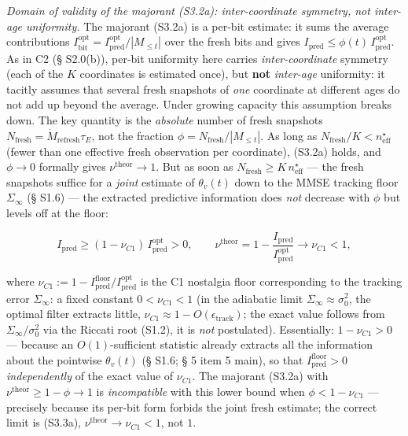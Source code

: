 \documentclass[12pt]{iopart}
\begin{document}
\emph{Domain of validity of the majorant (S3.2a): inter-coordinate symmetry, not inter-age uniformity.} The majorant (S3.2a) is a per-bit estimate: it sums the average contributions \(I^{\text{opt}}_{\text{bit}} = I_{\text{pred}}^{\text{opt}}/|M_{\le t}|\) over the fresh bits and gives \(I_{\text{pred}} \le \phi(t)\,I_{\text{pred}}^{\text{opt}}\). As in C2 (§ S2.0(b)), per-bit uniformity here carries \emph{inter-coordinate} symmetry (each of the \(K\) coordinates is estimated once), but \textbf{not} \emph{inter-age} uniformity: it tacitly assumes that several fresh snapshots of \emph{one} coordinate at different ages do not add up beyond the average. Under growing capacity this assumption breaks down. The key quantity is the \emph{absolute} number of fresh snapshots \(N_{\text{fresh}} = \dot M_{\text{refresh}}\tau_E\), not the fraction \(\phi = N_{\text{fresh}}/|M_{\le t}|\). As long as \(N_{\text{fresh}}/K < n_{\text{eff}}^\star\) (fewer than one effective fresh observation per coordinate), (S3.2a) holds, and \(\phi \to 0\) formally gives \(\nu^{\text{theor}} \to 1\). But as soon as \(N_{\text{fresh}} \ge K\,n_{\text{eff}}^\star\) --- the fresh snapshots suffice for a \emph{joint} estimate of \(\theta_v(t)\) down to the MMSE tracking floor \(\Sigma_\infty\) (§ S1.6) --- the extracted predictive information does \emph{not} decrease with \(\phi\) but levels off at the floor:



\begin{equation}I_{\text{pred}} \ge (1-\nu_{C1})\,I_{\text{pred}}^{\text{opt}} > 0, \qquad \nu^{\text{theor}} = 1 - \frac{I_{\text{pred}}}{I_{\text{pred}}^{\text{opt}}} \to \nu_{C1} < 1, \tag{S3.3a}\end{equation}



where \(\nu_{C1} := 1 - I_{\text{pred}}^{\text{floor}}/I_{\text{pred}}^{\text{opt}}\) is the C1 nostalgia floor corresponding to the tracking error \(\Sigma_\infty\): a fixed constant \(0 < \nu_{C1} < 1\) (in the adiabatic limit \(\Sigma_\infty \approx \sigma_0^2\), the optimal filter extracts little, \(\nu_{C1} \approx 1 - O(\epsilon_{\text{track}})\); the exact value follows from \(\Sigma_\infty/\sigma_0^2\) via the Riccati root (S1.2), it is \emph{not} postulated). Essentially: \(1-\nu_{C1} > 0\) --- because an \(O(1)\)-sufficient statistic already extracts all the information about the pointwise \(\theta_v(t)\) (§ S1.6; § 5 item 5 main), so that \(I_{\text{pred}}^{\text{floor}} > 0\) \emph{independently} of the exact value of \(\nu_{C1}\). The majorant (S3.2a) with \(\nu^{\text{theor}} \ge 1-\phi \to 1\) is \emph{incompatible} with this lower bound when \(\phi < 1-\nu_{C1}\) --- precisely because its per-bit form forbids the joint fresh estimate; the correct limit is (S3.3a), \(\nu^{\text{theor}} \to \nu_{C1} < 1\), not \(1\).
\end{document}
